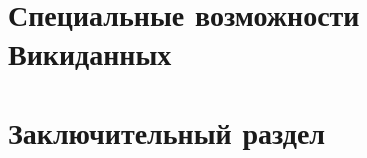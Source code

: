 \documentclass[nofonts,justified,nobib]{tufte-book}%
\theoremstyle{definition}
\begin{document}
\part{Специальные возможности Викиданных}



\part{Заключительный раздел}

















\backmatter

%
%
\printbibliography 

\printindex
\end{document}

